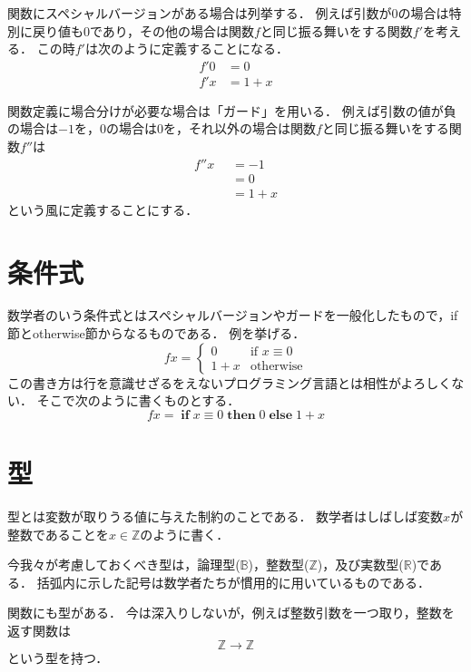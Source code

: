 \documentclass[twocolumn]{jsbook}
\newcommand{\booleantype}{\mathbb{B}}
\newcommand{\guard}[1]{\mathop{\mid_{{#1}}}}
\newcommand{\integertype}{\mathbb{Z}}
\newcommand{\mathif}{\mathop{\textbf{if}}}
\newcommand{\mathelse}{\mathop{\textbf{else}}}
\newcommand{\maththen}{\mathop{\textbf{then}}}
\newcommand{\otherwise}{\textbf{otherwise}}
\newcommand{\realtype}{\mathbb{R}}
\begin{document}
関数にスペシャルバージョンがある場合は列挙する．
例えば引数が$0$の場合は特別に戻り値も0であり，その他の場合は関数$f$と同じ振る舞いをする関数$f'$を考える．
この時$f'$は次のように定義することになる．
\begin{equation}
\begin{split}
f'0&=0\\
f'x&=1+x
\end{split}
\end{equation}

関数定義に場合分けが必要な場合は「ガード」を用いる．
例えば引数の値が負の場合は$-1$を，$0$の場合は$0$を，それ以外の場合は関数$f$と同じ振る舞いをする関数$f''$は
\begin{equation*}
\begin{split}
f''x&\guard{x<0}=-1\\
&\guard{x\equiv0}=0\\
&\guard{\otherwise}=1+x
\end{split}
\end{equation*}
という風に定義することにする．

\section{条件式}

数学者のいう条件式とはスペシャルバージョンやガードを一般化したもので，if節とotherwise節からなるものである．
例を挙げる．
$$fx=\begin{cases}
0&\text{if $x\equiv0$}\\
1+x&\text{otherwise}
\end{cases}$$
この書き方は行を意識せざるをえないプログラミング言語とは相性がよろしくない．
そこで次のように書くものとする．
$$fx=\mathif x\equiv0\maththen0\mathelse 1+x$$

\section{型}

型とは変数が取りうる値に与えた制約のことである．
数学者はしばしば変数$x$が整数であることを$x\in\integertype$のように書く．

今我々が考慮しておくべき型は，論理型($\booleantype$)，整数型($\integertype$)，及び実数型($\realtype$)である．
括弧内に示した記号は数学者たちが慣用的に用いているものである．

関数にも型がある．
今は深入りしないが，例えば整数引数を一つ取り，整数を返す関数は$$\integertype\rightarrow\integertype$$という型を持つ．
\end{document}
